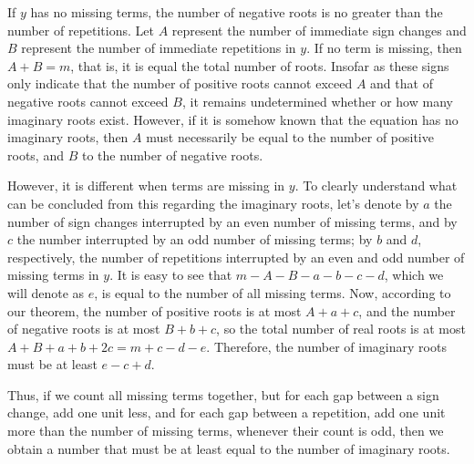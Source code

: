 \documentclass[14pt]{memoir}
\theoremstyle{plain}
\theoremstyle{remark}
\begin{document}
If \(y\) has no missing terms, the number of negative roots is no greater than the number of repetitions. Let \(A\) represent the number of immediate sign changes and \(B\) represent the number of immediate repetitions in \(y\). If no term is missing, then \(A+B=m\), that is, it is equal the total number of roots. Insofar as these signs only indicate that the number of positive roots cannot exceed \(A\) and that of negative roots cannot exceed \(B\), it remains undetermined whether or how many imaginary roots exist. However, if it is somehow known that the equation has no imaginary roots, then \(A\) must necessarily be equal to the number of positive roots, and \(B\) to the number of negative roots.

However, it is different when terms are missing in \(y\). To clearly understand what can be concluded from this regarding the imaginary roots, let's denote by \(a\) the number of sign changes interrupted by an even number of missing terms, and by \(c\) the number interrupted by an odd number of missing terms; by \(b\) and \(d\), respectively, the number of repetitions interrupted by an even and odd number of missing terms in \(y\). It is easy to see that \(m-A-B-a-b-c-d\), which we will denote as \(e\), is equal to the number of all missing terms. Now, according to our theorem, the number of positive roots is at most \(A+a+c\), and the number of negative roots is at most \(B+b+c\), so the total number of real roots is at most \(A+B+a+b+2c=m+c-d-e\). Therefore, the number of imaginary roots must be at least \(e-c+d\).

Thus, if we count all missing terms together, but for each gap between a sign change, add one unit less, and for each gap between a repetition, add one unit more than the number of missing terms, whenever their count is odd, then we obtain a number that must be at least equal to the number of imaginary roots.
\end{document}
